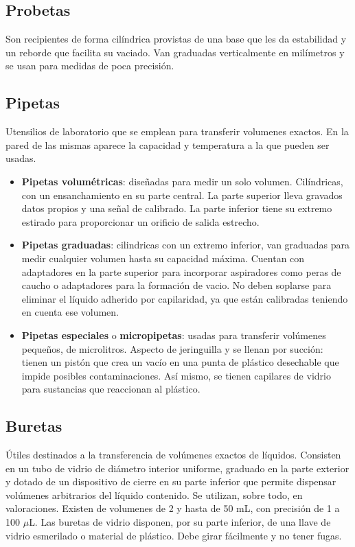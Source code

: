 \subsection{Probetas}
Son recipientes de forma cilíndrica provistas de una base que les da estabilidad y un reborde que facilita su vaciado. Van graduadas verticalmente en milímetros y se usan para medidas de poca precisión.
\subsection{Pipetas}
Utensilios de laboratorio que se emplean para transferir volumenes exactos. En la pared de las mismas aparece la capacidad y temperatura a la que pueden ser usadas.
\begin{itemize}[itemsep=0pt,parsep=0pt,topsep=0pt,partopsep=0pt]
    \item \textbf{Pipetas volumétricas}: diseñadas para medir un solo volumen. Cilíndricas, con un ensanchamiento en su parte central. La parte superior lleva gravados datos propios y una señal de calibrado. La parte inferior tiene su extremo estirado para proporcionar un orificio de salida estrecho.
    \item\textbf{Pipetas graduadas}: cilindricas con un extremo inferior, van graduadas para medir cualquier volumen hasta su capacidad máxima. Cuentan con adaptadores en la parte superior para incorporar aspiradores como peras de caucho o adaptadores para la formación de vacio. No deben soplarse para eliminar el líquido adherido por capilaridad, ya que están calibradas teniendo en cuenta ese volumen.
    \item\textbf{Pipetas especiales} o \textbf{micropipetas}: usadas para transferir volúmenes pequeños, de microlitros. Aspecto de jeringuilla y se llenan por succión: tienen un pistón que crea un vacío en una punta de plástico desechable que impide posibles contaminaciones. Así mismo, se tienen capilares de vidrio para sustancias que reaccionan al plástico.
\end{itemize}
\subsection{Buretas}
Útiles destinados a la transferencia de volúmenes exactos de líquidos. Consisten en un tubo de vidrio de diámetro interior uniforme, graduado en la parte exterior y dotado de un dispositivo de cierre en su parte inferior que permite dispensar volúmenes arbitrarios del líquido contenido. Se utilizan, sobre todo, en valoraciones. Existen de volumenes de 2 y hasta de 50 mL, con precisión de 1 a 100 $\mu$L. Las buretas de vidrio disponen, por su parte inferior, de una llave de vidrio esmerilado o material de plástico. Debe girar fácilmente y no tener fugas.

